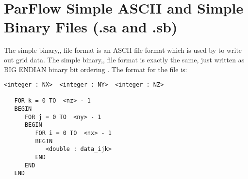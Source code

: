 \section{ParFlow Simple ASCII  and Simple Binary Files (.sa and .sb)}
\label{ParFlow Simple ASCII Files (.sa and .sb)}

The simple binary,, file format is an ASCII file format which is used by 
to write out \parflow{} grid data.  The simple binary,, file format is exactly the same, just written as BIG ENDIAN binary bit ordering \cite{endian}.
The format for the file is:

\begin{display}\begin{verbatim}
<integer : NX>  <integer : NY>  <integer : NZ>

   FOR k = 0 TO  <nz> - 1
   BEGIN
      FOR j = 0 TO  <ny> - 1
      BEGIN
         FOR i = 0 TO  <nx> - 1
         BEGIN
            <double : data_ijk>
         END
      END
   END
\end{verbatim}\end{display}
